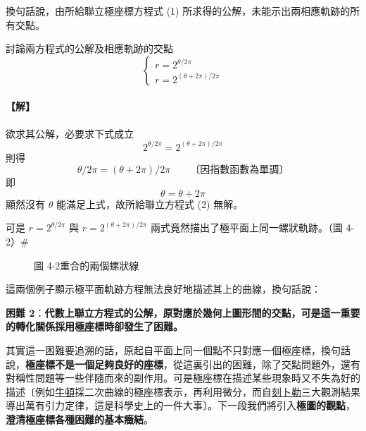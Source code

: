 \medskip
換句話說，由所給聯立極座標方程式 (1) 所求得的公解，未能示出兩相應軌跡的所有交點。

\medskip
\begin{example}\label{ex:b5-1-4-2}
討論兩方程式的公解及相應軌跡的交點
\begin{equation}
\begin{cases}
r = 2^{\theta / 2\pi} \\[4pt]
r = 2^{(\theta + 2\pi) / 2\pi}
\end{cases}
\tag{2}
\end{equation}
\end{example}
\paragraph{【解】}
欲求其公解，必要求下式成立
\[
2^{\theta / 2\pi} = 2^{(\theta + 2\pi) / 2\pi}
\]
則得
\[
\theta / 2\pi = (\theta + 2\pi) / 2\pi \qquad \text{〔因指數函數為單調〕}
\]
即
\[
\theta = \theta + 2\pi
\]
顯然沒有 $\theta$ 能滿足上式，故所給聯立方程式 (2) 無解。

可是 $r = 2^{\theta / 2\pi}$ 與 $r = 2^{(\theta + 2\pi) / 2\pi}$ 兩式竟然描出了極平面上同一螺狀軌跡。（圖 4-2）\hfill$\#$

\begin{figure}[H]
\centering
{}
\caption*{圖 4-2\quad 重合的兩個螺狀線}
\end{figure}

這兩個例子顯示極平面軌跡方程無法良好地描述其上的曲線，換句話說：

\medskip
\noindent\textbf{困難 2}：\textbf{代數上聯立方程式的公解，原對應於幾何上圖形間的交點，可是這一重要的轉化關係採用極座標時卻發生了困難。}

\medskip
其實這一困難要追溯的話，原起自平面上同一個點不只對應一個極座標，換句話說，\textbf{極座標不是一個足夠良好的座標}，從這裏引出的困難，除了交點問題外，還有對稱性問題等一些伴隨而來的副作用。可是極座標在描述某些現象時又不失為好的描述〔例如\underline{牛頓}採二次曲線的極座標表示，再利用微分，而自\underline{刻卜勒}三大觀測結果導出萬有引力定律，這是科學史上的一件大事〕。下一段我們將引入\textbf{極圖的觀點}，\textbf{澄清極座標各種困難的基本癥結}。

